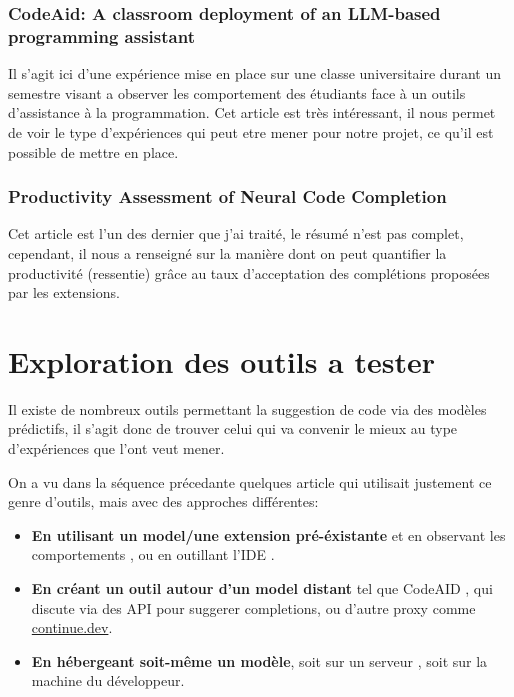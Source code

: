 \subsubsection{CodeAid: A classroom deployment of an LLM-based programming assistant \cite{codeaid}}

Il s'agit ici d'une expérience mise en place sur une classe universitaire durant un semestre visant a observer les comportement des étudiants
face à un outils d'assistance à la programmation.
Cet article est très intéressant, il nous permet de voir le type d'expériences qui peut etre mener pour notre projet, ce qu'il est possible de mettre en place.


\subsubsection{Productivity Assessment of Neural Code Completion \cite{productivity-assess}}

Cet article est l'un des dernier que j'ai traité, le résumé n'est pas complet, cependant, il nous a renseigné sur la manière dont on peut
quantifier la productivité (ressentie) grâce au taux d'acceptation des complétions proposées par les extensions.


\section{Exploration des outils a tester}
\label{explo}

Il existe de nombreux outils permettant la suggestion de code via des modèles prédictifs, il s'agit donc de trouver celui qui va convenir le mieux au type d'expériences que l'ont veut mener.

On a vu dans la séquence précedante quelques article qui utilisait justement ce genre d'outils, mais avec des approches différentes:

\begin{itemize}
  \item \textbf{En utilisant un model/une extension pré-éxistante} et en observant les comportements \cite{grouded}, ou en outillant l'IDE \cite{productivity-assess}.
  \item \textbf{En créant un outil autour d'un model distant} tel que CodeAID \cite{codeaid}, qui discute via des API pour suggerer completions, ou d'autre proxy comme \href{https://continue.dev}{continue.dev}.
  \item \textbf{En hébergeant soit-même un modèle}, soit sur un serveur \cite{llm-online-offline}, soit sur la machine du développeur.
\end{itemize}


